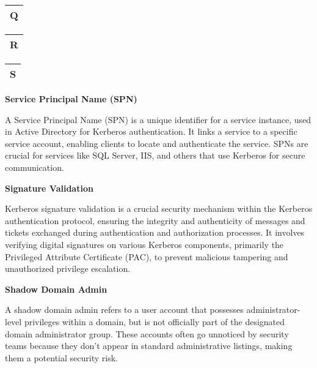\begin{table}
\justifying

\begin{tabular}{l}
\textbf{Q} \\
\hline

\end{tabular}

\end{table}

\begin{table}
\justifying

\begin{tabular}{l}
\textbf{R} \\
\hline

\end{tabular}

\end{table}

\begin{table}
\justifying

\begin{tabular}{l}
\textbf{S} \\
\hline

\end{tabular}

\end{table}

\textbf{Service Principal Name (SPN)}

A Service Principal Name (SPN) is a unique identifier for a service instance, used in Active Directory for Kerberos authentication. It links a service to a specific service account, enabling clients to locate and authenticate the service. SPNs are crucial for services like SQL Server, IIS, and others that use Kerberos for secure communication.

\textbf{Signature Validation}

Kerberos signature validation is a crucial security mechanism within the Kerberos authentication protocol, ensuring the integrity and authenticity of messages and tickets exchanged during authentication and authorization processes. It involves verifying digital signatures on various Kerberos components, primarily the Privileged Attribute Certificate (PAC), to prevent malicious tampering and unauthorized privilege escalation.

\textbf{Shadow Domain Admin}

A shadow domain admin refers to a user account that possesses administrator-level privileges within a domain, but is not officially part of the designated domain administrator group. These accounts often go unnoticed by security teams because they don't appear in standard administrative listings, making them a potential security risk.

